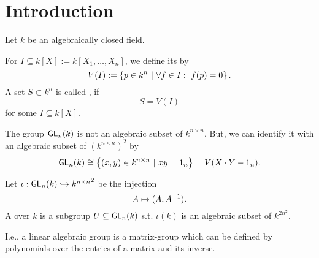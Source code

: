 \section{Introduction}
Let $k$ be an algebraically closed field.

\begin{definition}
For $I \subseteq k[X]:=k[X_1,\ldots, X_n]$, we define its  by
\[ V(I) := \left\lbrace p \in k^n ~ | ~ \forall f \in I:~ f(p) = 0\right\rbrace. \]
A set $S \subset k^n$ is called , if
\[ S = V(I) \]
for some  $I \subseteq k[X]$.
\end{definition}
\begin{example}
	The group $\textsf{GL}_n(k)$ is not an algebraic subset of $k^{n\times n}$. But, we can identify it with an algebraic subset of $(k^{n\times n})^2$ by
	\[\textsf{GL}_n(k) \overset{}{\cong} \left\lbrace(x,y) \in k^{n\times n} ~ | ~ xy = 1_n\right\rbrace = V( X \cdot Y - 1_n ). \]
\end{example}
\begin{definition}
	Let $\iota: \textsf{GL}_n(k) \overset{}{\hookrightarrow} {k^{n\times n}}^2$ be the injection
	\[ A \mapsto (A, A^{-1}). \]
	A  over $k$ is a subgroup $U \subseteq \textsf{GL}_n(k)$ s.t. $\iota(k)$ is an algebraic subset of $k^{2n^2}$.
	
	I.e., a linear algebraic group is a matrix-group which can be defined by polynomials over the entries of a matrix and its inverse.
\end{definition}
